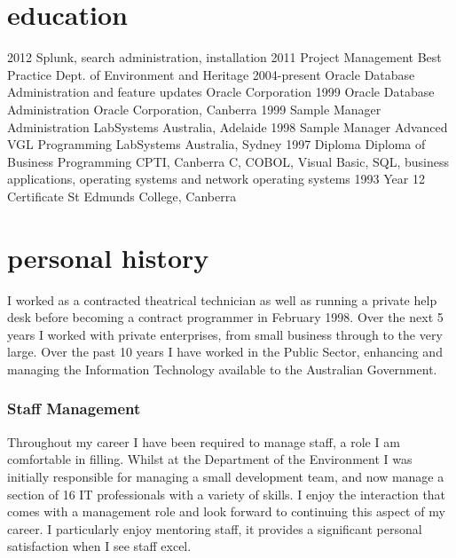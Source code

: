 \documentclass[]{friggeri-cv} %
\begin{document}
\section{education}
\begin{entrylist}
\entry
{2012}
{Splunk, search administration, installation}
{ }
{ }
\entry
{2011}
{Project Management Best Practice}
{Dept. of Environment and Heritage}
{ }
\entry
{2004-present}
{Oracle {\normalfont Database Administration and feature updates}}
{Oracle Corporation}
{ }
\entry
{1999}
{Oracle {\normalfont Database Administration}}
{Oracle Corporation, Canberra}
{ }
\entry
{1999}
{Sample Manager {\normalfont Administration}}
{LabSystems Australia, Adelaide}
{ }
\entry
{1998}
{Sample Manager {\normalfont Advanced VGL Programming}}
{LabSystems Australia, Sydney}
{ }
\entry
{1997}
{Diploma {\normalfont Diploma of Business Programming}}
{CPTI, Canberra}
{C, COBOL, Visual Basic, SQL, business applications, operating systems and network operating systems}
\entry
{1993}
{Year 12 Certificate}
{St Edmunds College, Canberra}
{ }
\end{entrylist}

\section{personal history}
I worked as a contracted theatrical technician as well as running a private help desk before becoming a contract programmer in February 1998. Over the next 5 years I worked with private enterprises, from small business through to the very large. Over the past 10 years I have worked in the Public Sector, enhancing and managing the Information Technology available to the Australian Government.

\subsubsection*{Staff Management}
Throughout my career I have been required to manage staff, a role I am comfortable in filling. Whilst at the Department of the Environment I was initially responsible for managing a small development team, and now manage a section of 16 IT professionals with a variety of skills.  I enjoy the interaction that comes with a management role and look forward to continuing this aspect of my career.  I particularly enjoy mentoring staff, it provides a significant personal satisfaction when I see staff excel.
\end{document}
